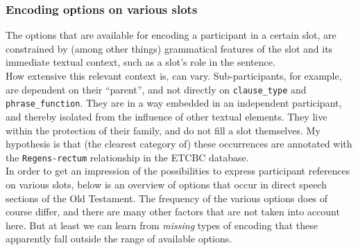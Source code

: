 \documentclass{report}
\newcommand{\mi}[1]{\lstinline{#1}}
\begin{document}
\subsubsection{Encoding options on various slots}
The options that are available for encoding a participant in a certain slot, are constrained by (among other things) grammatical features of the slot and its immediate textual context, such as a slot's role in the sentence. \\
How extensive this relevant context is, can vary. Sub-participants, for example, are dependent on their ``parent'', and not directly on \mi{clause_type} and \mi{phrase_function}. They are in a way embedded in an independent participant, and thereby isolated from the influence of other textual elements. They live within the protection of their family, and do not fill a slot themselves. My hypothesis is that (the clearest category of) these occurrences are annotated with the \mi{Regens-rectum} relationship in the ETCBC database.\\

In order to get an impression of the possibilities to express participant references on various slots, below is an overview of options that occur in direct speech sections of the Old Testament. The frequency of the various options does of course differ, and there are many other factors that are not taken into account here. But at least we can learn from \emph{missing} types of encoding that these apparently fall outside the range of available options.
\end{document}
